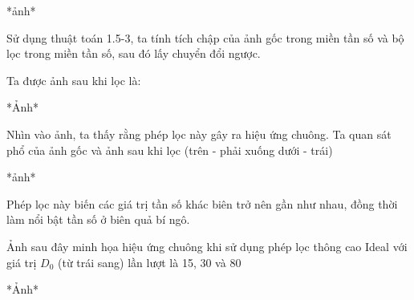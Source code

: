 \documentclass[12pt,a4paper]{report}
\numberwithin{equation}{section}
\theoremstyle{definition} %
\begin{document}
*ảnh*

Sử dụng thuật toán 1.5-3, ta tính tích chập của ảnh gốc trong miền tần số và bộ lọc trong miền tần số, sau đó lấy chuyển đổi ngược.

Ta được ảnh sau khi lọc là:

*Ảnh*

Nhìn vào ảnh, ta thấy rằng phép lọc này gây ra hiệu ứng chuông. Ta quan sát phổ của ảnh gốc và ảnh sau khi lọc (trên - phải xuống dưới - trái)

*ảnh*

Phép lọc này biến các giá trị tần số khác biên trở nên gần như nhau, đồng thời làm nổi bật tần số ở biên quả bí ngô.

Ảnh sau đây minh họa hiệu ứng chuông khi sử dụng phép lọc thông cao Ideal với giá trị $D_0$ (từ trái sang) lần lượt là 15, 30 và 80

*Ảnh*
\end{document}
